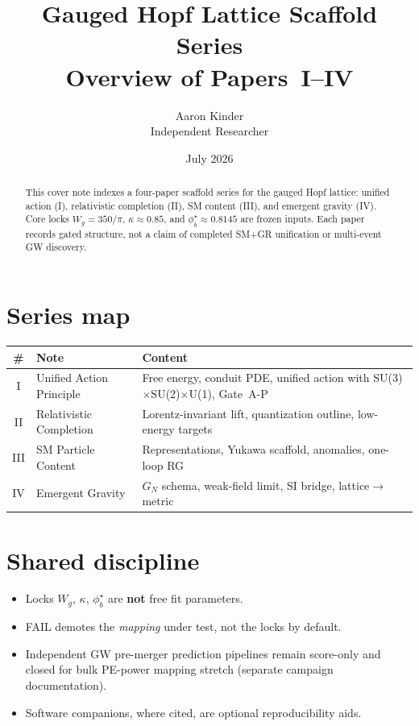 \documentclass[11pt]{article}
\title{Gauged Hopf Lattice Scaffold Series\\
\large Overview of Papers~I--IV}
\author{Aaron Kinder \\ Independent Researcher}
\date{July 2026}
\begin{document}
\maketitle

\begin{abstract}
This cover note indexes a four-paper scaffold series for the gauged Hopf lattice:
unified action (I), relativistic completion (II), SM content (III), and emergent
gravity (IV). Core locks $W_g=350/\pi$, $\kappa\approx 0.85$, and
$\phi_b^\star\approx 0.8145$ are frozen inputs. Each paper records gated
structure, not a claim of completed SM+GR unification or multi-event GW discovery.
\end{abstract}

\section{Series map}

\begin{center}
\begin{tabular}{@{}clp{}@{}}
\hline
\# & Note & Content \\
\hline
I & Unified Action Principle & Free energy, conduit PDE, unified action with
  SU(3)$\times$SU(2)$\times$U(1), Gate~A-P \\
II & Relativistic Completion & Lorentz-invariant lift, quantization outline,
  low-energy targets \\
III & SM Particle Content & Representations, Yukawa scaffold, anomalies, one-loop RG \\
IV & Emergent Gravity & $G_N$ schema, weak-field limit, SI bridge, lattice$\to$metric \\
\hline
\end{tabular}
\end{center}

\section{Shared discipline}

\begin{itemize}
\item Locks $W_g$, $\kappa$, $\phi_b^\star$ are \textbf{not} free fit parameters.
\item FAIL demotes the \emph{mapping} under test, not the locks by default.
\item Independent GW pre-merger prediction pipelines remain score-only and closed
  for bulk PE-power mapping stretch (separate campaign documentation).
\item Software companions, where cited, are optional reproducibility aids.
\end{itemize}
\end{document}
